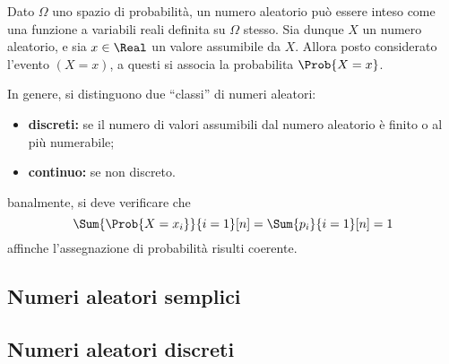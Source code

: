 \documentclass{subfiles}
\begin{document}
Dato $\Omega$ uno spazio di probabilità, un numero aleatorio può essere inteso come una funzione a variabili reali definita su $\Omega$ stesso.
Sia dunque $X$ un numero aleatorio, e sia $x \in \Real$ un valore assumibile da $X$.
Allora posto considerato l'evento $(X = x)$, a questi si associa la probabilita $\Prob{X = x}$.

In genere, si distinguono due ``classi'' di numeri aleatori:
\begin{itemize}
    \item \textbf{discreti:} se il numero di valori assumibili dal numero aleatorio è finito o al più numerabile;
    \item \textbf{continuo:} se non discreto.
\end{itemize}
\begin{Remark*}
    banalmente, si deve verificare che
    $$
        \Sum{\Prob{X = x_{i}}}{i = 1}[n] = \Sum{p_{i}}{i = 1}[n] = 1
    $$
    affinche l'assegnazione di probabilità risulti coerente.
\end{Remark*}

\subsection{Numeri aleatori semplici}

\clearpage

\subsection{Numeri aleatori discreti}

\end{document}
